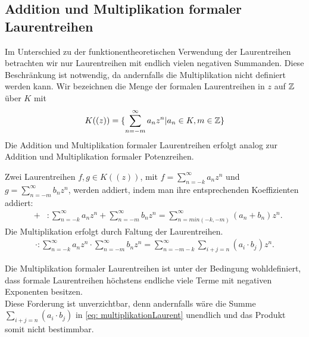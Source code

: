 \subsection{Addition und Multiplikation formaler Laurentreihen}\label{RechnenMitLaurentreihen}
%
%
Im Unterschied zu der funktionentheoretischen Verwendung der Laurentreihen betrachten wir nur Laurentreihen mit endlich vielen negativen Summanden. Diese Beschränkung ist notwendig, da andernfalls die Multiplikation nicht definiert werden kann.
Wir bezeichnen die Menge der formalen Laurentreihen in $z$ auf $\mathbb{Z}$ über $K$ mit
\begin{equation*} %
K((z)) = \lbrace \sum_{n =-m}^{\infty} a_nz^n \vert a_n \in K, m \in \Z\rbrace
\end{equation*} 
Die Addition und Multiplikation formaler Laurentreihen erfolgt analog zur Addition und Multiplikation formaler Potenzreihen.
\begin{defn}
Zwei Laurentreihen $f, g \in K((z))$, mit $f = \sum_{n=-k}^\infty a_n z^n$ und $g= \sum_{n=-m}^\infty b_n z^n$, werden addiert, indem man ihre entsprechenden Koeffizienten addiert: 
%
\begin{eqnarray}
&+& \colon \sum_{n=-k}^\infty a_n z^n  +  \sum_{n=-m}^\infty b_n z^n = \sum_{n = min(-k, -m)}^{\infty}(a_n + b_n) z^n.
\end{eqnarray}
%
%
Die Multiplikation erfolgt durch Faltung der Laurentreihen.
\begin{eqnarray}
\label{eq: multiplikationLaurent}
\cdot \colon \sum_{n=-k}^{\infty} a_n z^n  \cdot  \sum_{n=-m}^{\infty} b_n z^n = \sum_{n = -m-k}^{\infty}\sum_{i+j=n}^{}\left(a_i \cdot b_j\right) z^n. 
\end{eqnarray}
%

\end{defn}
%
\begin{bem}
Die Multiplikation formaler Laurentreihen ist unter der Bedingung wohldefiniert, dass formale Laurentreihen höchstens endliche viele Terme mit negativen Exponenten besitzen. \\
Diese Forderung ist unverzichtbar, denn andernfalls wäre die Summe $\sum_{i+j=n}^{}\left(a_i \cdot b_j\right)$ in \ref{eq: multiplikationLaurent} unendlich und das Produkt somit nicht bestimmbar.
\end{bem}

